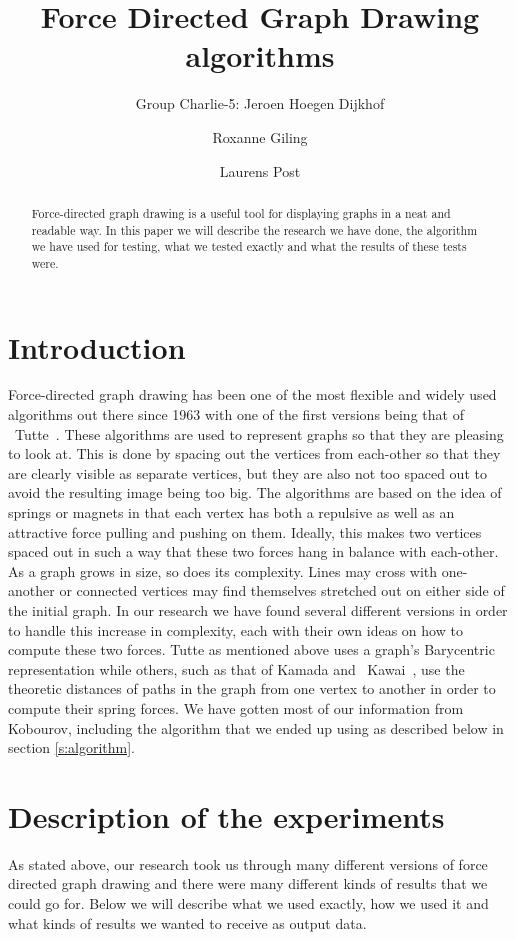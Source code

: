 \documentclass[a4paper,12pt,twoside]{article}
\begin{document}
\title{Force Directed Graph Drawing algorithms}
\author{Group Charlie-5: Jeroen Hoegen Dijkhof \and Roxanne Giling \and Laurens Post}
\maketitle
\begin{abstract}
Force-directed graph drawing is a useful tool for displaying graphs in a neat and readable way. In this paper we will describe the research we have done, the algorithm we have used for testing, what we tested exactly and what the results of these tests were.
\end{abstract}
\newpage

\section{Introduction}\label{s:Introduction}
Force-directed graph drawing has been one of the most flexible and widely used algorithms out there since 1963 with one of the first versions being that of ~Tutte~\cite{Tutte}. These algorithms are used to represent graphs so that they are pleasing to look at. This is done by spacing out the vertices from each-other so that they are clearly visible as separate vertices, but they are also not too spaced out to avoid the resulting image being too big. The algorithms are based on the idea of springs or magnets in that each vertex has both a repulsive as well as an attractive force pulling and pushing on them. Ideally, this makes two vertices spaced out in such a way that these two forces hang in balance with each-other. As a graph grows in size, so does its complexity. Lines may cross with one-another or connected vertices may find themselves stretched out on either side of the initial graph. In our research we have found several different versions in order to handle this increase in complexity, each with their own ideas on how to compute these two forces. Tutte as mentioned above uses a graph's Barycentric representation while others, such as that of Kamada and ~Kawai~\cite{Kawai}, use the theoretic distances of paths in the graph from one vertex to another in order to compute their spring forces. We have gotten most of our information from Kobourov\cite{Kobourov}, including the algorithm that we ended up using as described below in section \ref{s:algorithm}.

\section{Description of the experiments}
As stated above, our research took us through many different versions of force directed graph drawing and there were many different kinds of results that we could go for. Below we will describe what we used exactly, how we used it and what kinds of results we wanted to receive as output data.
\end{document}

